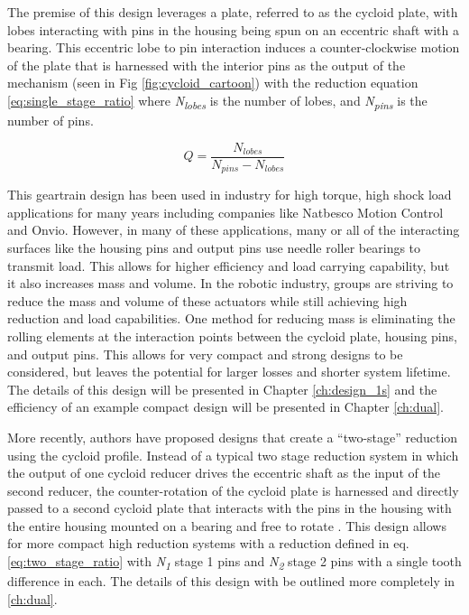 The premise of this design leverages a plate, referred to as the cycloid plate, with lobes interacting with pins in the housing being spun on an eccentric shaft with a bearing.
This eccentric lobe to pin interaction induces a counter-clockwise motion of the plate that is harnessed with the interior pins as the output of the mechanism (seen in Fig \ref{fig:cycloid_cartoon}) with the reduction equation \ref{eq:single_stage_ratio} where \textit{N\textsubscript{lobes}} is the number of lobes, and \textit{N\textsubscript{pins}} is the number of pins. 

\begin{equation} \label{eq:single_stage_ratio}
Q = \frac{N_{lobes}} {N_{pins} - N_{lobes}}
\end{equation}

This geartrain design has been used in industry for high torque, high shock load applications for many years including companies like Natbesco Motion Control and Onvio.
However, in many of these applications, many or all of the interacting surfaces like the housing pins and output pins use needle roller bearings to transmit load.
This allows for higher efficiency and load carrying capability, but it also increases mass and volume.
In the robotic industry, groups are striving to reduce the mass and volume of these actuators while still achieving high reduction and load capabilities.
One method for reducing mass is eliminating the rolling elements at the interaction points between the cycloid plate, housing pins, and output pins.
This allows for very compact and strong designs to be considered, but leaves the potential for larger losses and shorter system lifetime. The details of this design will be presented in Chapter \ref{ch:design_1s} and the efficiency of an example compact design will be presented in Chapter \ref{ch:dual}. 


More recently, authors have proposed designs that create a ``two-stage'' reduction using the cycloid profile. Instead of a typical two stage reduction system in which the output of one cycloid reducer drives the eccentric shaft as the input of the second reducer, the counter-rotation of the cycloid plate is harnessed and directly passed to a second cycloid plate that interacts with the pins in the housing with the entire housing mounted on a bearing and free to rotate \cite{ref:new_two_stage}. This design allows for more compact high reduction systems with a reduction defined in eq. \ref{eq:two_stage_ratio} \cite{ref:two_stage_tooth_mod} with \textit{N\textsubscript{1}} stage 1 pins and \textit{N\textsubscript{2}} stage 2 pins with a single tooth difference in each. The details of this design with be outlined more completely in \ref{ch:dual}.

